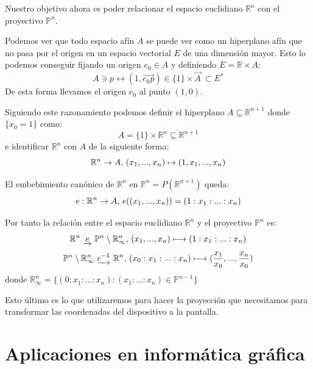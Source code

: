 \documentclass[a4paper,11pt, oneside]{book}
\begin{document}
Nuestro objetivo ahora es poder relacionar el espacio euclidiano $\mathbb R^n$ con el proyectivo $\mathbb P^n$. 

Podemos ver que todo espacio afín $A$ se puede ver como un hiperplano afín que no pasa por el origen en un espacio vectorial $E$ de una dimensión mayor. Esto lo podemos conseguir fijando un origen $e_0 \in A$ y definiendo $E = \mathbb R \times A$:
\begin{equation}
	A \ni p \longleftrightarrow (1, \overrightarrow{e_0p}) \in \{1\}\times\overrightarrow{A} \ \subset E^*
\end{equation}
De esta forma llevamos el origen $e_0$ al punto $(1,0)$. 

Siguiendo este razonamiento podemos definir el hiperplano $A \subseteq \mathbb R^{n+1}$ donde $\{x_0 = 1\}$ como:
\begin{equation}
	A = \{1\} \times \mathbb R^n \subseteq \mathbb R^{n+1}
\end{equation}
e identificar $\mathbb R^n$ con $A$ de la siguiente forma:
\begin{equation}
	\mathbb R^n \rightarrow A \textup{,  } (x_1,...,x_n) \mapsto (1,x_1,...,x_n)
\end{equation}

El embebimiento canónico de $\mathbb R^n$ en $\mathbb P^n = P(\mathbb R^{n+1})$ queda:
\begin{equation}
	e: \mathbb R^n \rightarrow A \textup{,   } e((x_1,...,x_n)) = (1:x_1:...:x_n)
\end{equation}

Por tanto la relación entre el espacio euclidiano $\mathbb R^n$ y el proyectivo $\mathbb P^n$ es:
\begin{equation}
	\mathbb R^n \textup{ } \underrightarrow{e} \textup{ } \mathbb P^n \setminus \mathbb R^n_{\infty}\textup{,     } (x_1,...,x_n) \longmapsto (1:x_1:...:x_n)
\end{equation}
\begin{equation}
	\mathbb P^n \setminus \mathbb R^n_{\infty} \textup{ }   \underrightarrow{e^{-1}} \textup{ }\mathbb R^n \textup{,     } (x_0:x_1:...:x_n) \longmapsto (\frac{x_1}{x_0},...,\frac{x_n}{x_0})
\end{equation}
donde $\mathbb R^n_{\infty} = \{(0:x_1:...:x_n) : (x_1:...:x_n) \in  \mathbb P^{n-1}\}$

Esto último es lo que utilizaremos para hacer la proyección que necesitamos para transformar las coordenadas del dispositivo a la pantalla.


\section{Aplicaciones en informática gráfica}
\end{document}

